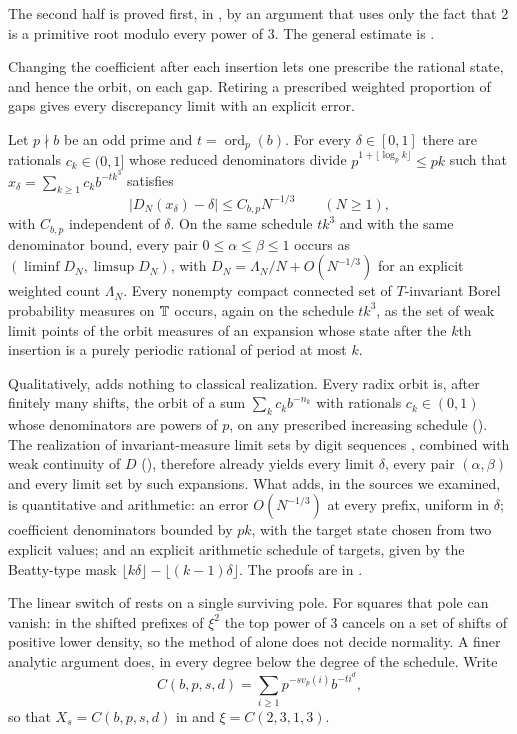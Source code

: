 \documentclass[11pt]{article}
\DeclareMathOperator{\ord}{ord}
\begin{document}
The second half is proved first, in , by an argument that uses only the fact
that $2$ is a primitive root modulo every power of $3$. The general estimate is .

Changing the coefficient after each insertion lets one prescribe the rational state, and hence the
orbit, on each gap. Retiring a prescribed weighted proportion of gaps gives every discrepancy limit
with an explicit error.

\begin{maintheorem}\label{thm:C}
Let $p\nmid b$ be an odd prime and $t=\ord_p(b)$. For every $\delta\in[0,1]$ there are rationals
$c_k\in(0,1]$ whose reduced denominators divide $p^{1+\lfloor\log_pk\rfloor}\le pk$ such that
$x_\delta=\sum_{k\ge1}c_kb^{-tk^3}$ satisfies
\[
|D_N(x_\delta)-\delta|\le C_{b,p}N^{-1/3}\qquad(N\ge1),
\]
with $C_{b,p}$ independent of $\delta$. On the same schedule $tk^3$ and with the same denominator bound,
every pair $0\le\alpha\le\beta\le1$ occurs as $(\liminf D_N,\limsup D_N)$, with
$D_N=\Lambda_N/N+O(N^{-1/3})$ for an explicit weighted count $\Lambda_N$. Every nonempty compact
connected set of $T$-invariant Borel probability measures on $\mathbb T$ occurs, again on the schedule $tk^3$,
as the set of weak limit points of the orbit measures of an expansion whose state after the $k$th
insertion is a purely periodic rational of period at most $k$.
\end{maintheorem}

Qualitatively,  adds nothing to classical realization. Every radix orbit is, after
finitely many shifts, the orbit of a sum $\sum_kc_kb^{-n_k}$ with rationals $c_k\in(0,1)$ whose
denominators are powers of $p$, on any prescribed increasing schedule (). The
realization of invariant-measure limit sets by digit sequences \cite{Colebrook,Sigmund74,DGS}, combined
with weak continuity of $D$ (), therefore already yields every limit $\delta$, every pair
$(\alpha,\beta)$ and every limit set by such expansions. What  adds, in the sources we
examined, is quantitative and arithmetic: an error $O(N^{-1/3})$ at every prefix, uniform in $\delta$;
coefficient denominators bounded by $pk$, with the target state chosen from two explicit values; and an
explicit arithmetic schedule of targets, given by the Beatty-type mask
$\lfloor k\delta\rfloor-\lfloor(k-1)\delta\rfloor$. The proofs are in .

The linear switch of  rests on a single surviving pole. For squares that pole can
vanish: in the shifted prefixes of $\xi^2$ the top power of $3$ cancels on a set of shifts of positive
lower density, so the method of  alone does not decide normality. A finer analytic argument
does, in every degree below the degree of the schedule. Write
\[
C(b,p,s,d)=\sum_{i\ge1}p^{-sv_p(i)}b^{-ti^d},
\]
so that $X_s=C(b,p,s,d)$ in  and $\xi=C(2,3,1,3)$.
\end{document}
